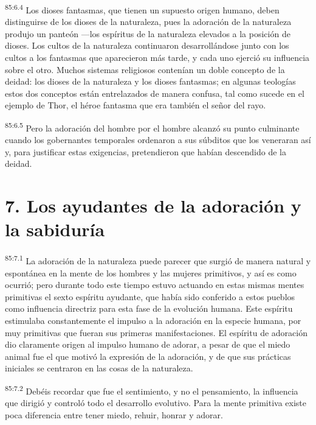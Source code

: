\documentclass[twoside, 11pt]{book}
\begin{document}
\par
\textsuperscript{85:6.4} Los dioses fantasmas, que tienen un supuesto origen humano, deben distinguirse de los dioses de la naturaleza, pues la adoración de la naturaleza produjo un panteón ---los espíritus de la naturaleza elevados a la posición de dioses. Los cultos de la naturaleza continuaron desarrollándose junto con los cultos a los fantasmas que aparecieron más tarde, y cada uno ejerció su influencia sobre el otro. Muchos sistemas religiosos contenían un doble concepto de la deidad: los dioses de la naturaleza y los dioses fantasmas; en algunas teologías estos dos conceptos están entrelazados de manera confusa, tal como sucede en el ejemplo de Thor, el héroe fantasma que era también el señor del rayo.

\par
\textsuperscript{85:6.5} Pero la adoración del hombre por el hombre alcanzó su punto culminante cuando los gobernantes temporales ordenaron a sus súbditos que los veneraran así y, para justificar estas exigencias, pretendieron que habían descendido de la deidad.

\section*{7. Los ayudantes de la adoración y la sabiduría}
\par
\textsuperscript{85:7.1} La adoración de la naturaleza puede parecer que surgió de manera natural y espontánea en la mente de los hombres y las mujeres primitivos, y así es como ocurrió; pero durante todo este tiempo estuvo actuando en estas mismas mentes primitivas el sexto espíritu ayudante, que había sido conferido a estos pueblos como influencia directriz para esta fase de la evolución humana. Este espíritu estimulaba constantemente el impulso a la adoración en la especie humana, por muy primitivas que fueran sus primeras manifestaciones. El espíritu de adoración dio claramente origen al impulso humano de adorar, a pesar de que el miedo animal fue el que motivó la expresión de la adoración, y de que sus prácticas iniciales se centraron en las cosas de la naturaleza.

\par
\textsuperscript{85:7.2} Debéis recordar que fue el sentimiento, y no el pensamiento, la influencia que dirigió y controló todo el desarrollo evolutivo. Para la mente primitiva existe poca diferencia entre tener miedo, rehuir, honrar y adorar.
\end{document}

